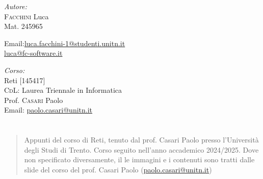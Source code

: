 \documentclass[twoside]{report}
\makeatletter
\renewenvironment{abstract}{%
    \if@twocolumn
        \section*{\abstractname}%
    \else
        \begin{center}%
            {\bfseries \abstractname\vspace{-.5em}\vspace{\z@}}%
        \end{center}%
        \small
        \begin{quotation}
    \fi}
    {\if@twocolumn\else\end{quotation}\fi}
\makeatother
\begin{document}
\begin{titlepage}
        \vfill
        \begin{minipage}[t]{0.4\textwidth}
            \begin{flushleft} \normalsize
                \emph{Autore:}\\
                \textsc{Facchini} Luca \\ %
                Mat. 245965 \\
                \vspace{-\baselineskip}
                \begin{tabbing}
                    Email:\= \href{mailto:luca.facchini-1@studenti.unitn.it}{luca.facchini-1@studenti.unitn.it} \\
                        \>  \href{mailto:luca@fc-software.it}{luca@fc-software.it}
                \end{tabbing}
            \end{flushleft}
        \end{minipage}%
        \hfill
        \begin{minipage}[t]{0.4\textwidth}
            \begin{flushleft} \normalsize
                \emph{Corso:}\\
                Reti [145417] \\
                \textsc{CdL}: Laurea Triennale in Informatica \\
                Prof. \textsc{Casari} Paolo \\
                Email: \href{mailto:paolo.casari@unitn.it}{paolo.casari@unitn.it}
            \end{flushleft}
        \end{minipage}
        \vfill
        \begin{abstract}
            Appunti del corso di Reti, tenuto dal prof. Casari Paolo presso l'Università degli Studi di Trento. Corso seguito nell'anno accademico 2024/2025.\newline
            Dove non specificato diversamente, il le immagini e i contenuti sono tratti dalle slide del corso del prof. Casari Paolo (\href{mailto:paolo.casari@unitn.it}{paolo.casari@unitn.it})
        \end{abstract}
        
    \end{titlepage}
    \begingroup
        \pagestyle{tocStyle}
        \tableofcontents
    \endgroup
    \pagestyle{stdPage}
    
\end{document}
